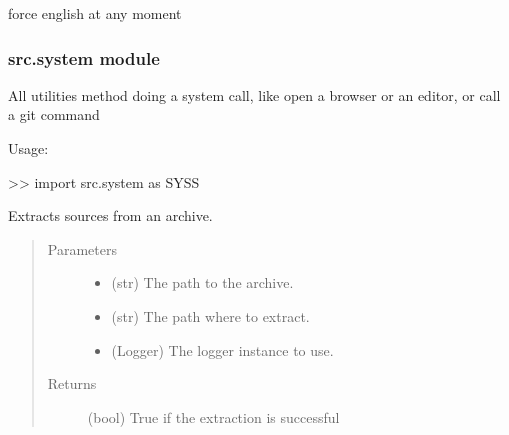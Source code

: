 \documentclass[a4paper,10pt,english]{sphinxmanual}
\begin{document}

\begin{fulllineitems}
\label{\detokenize{apidoc_src/src:src.salomeTools.setNotLocale}}
force english at any moment

\end{fulllineitems}



\subsubsection{src.system module}
\label{\detokenize{apidoc_src/src:src-system-module}}\label{\detokenize{apidoc_src/src:module-src.system}}
All utilities method doing a system call, 
like open a browser or an editor, or call a git command

\begin{DUlineblock}{0em}
\item[] Usage:
\item[] \textgreater{}\textgreater{} import src.system as SYSS
\end{DUlineblock}

\begin{fulllineitems}
\label{\detokenize{apidoc_src/src:src.system.archive_extract}}
Extracts sources from an archive.
\begin{quote}\begin{description}
\item[{Parameters}] \leavevmode\begin{itemize}
\item {} 
 \textendash{} (str) The path to the archive.

\item {} 
 \textendash{} (str) The path where to extract.

\item {} 
 \textendash{} (Logger) The logger instance to use.

\end{itemize}

\item[{Returns}] \leavevmode
(bool) True if the extraction is successful

\end{description}\end{quote}

\end{fulllineitems}
\end{document}
